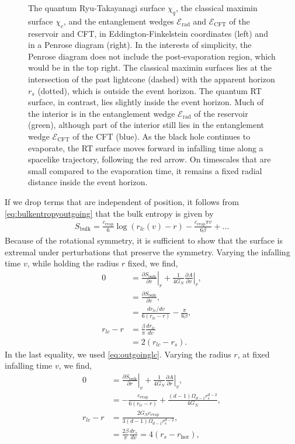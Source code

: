 \documentclass[12pt]{article}
\begin{document}
\begin{figure}[t]
\caption{The quantum Ryu-Takayanagi surface $\chi_q$, the classical maximin surface $\chi_c$, and the entanglement wedges $\mathcal{E}_\text{rad}$ and $\mathcal{E}_\text{CFT}$ of the reservoir and CFT, in Eddington-Finkelstein coordinates (left) and in a Penrose diagram (right). In the interests of simplicity, the Penrose diagram does not include the post-evaporation region, which would be in the top right. The classical maximin surfaces lies at the intersection of the past lightcone (dashed) with the apparent horizon $r_s$ (dotted), which is outside the event horizon. The quantum RT surface, in contrast, lies slightly inside the event horizon. Much of the interior is in the entanglement wedge $\mathcal{E}_\text{rad}$ of the reservoir (green), although part of the interior still lies in the entanglement wedge $\mathcal{E}_\text{CFT}$ of the CFT (blue). As the black hole continues to evaporate, the RT surface moves forward in infalling time along a spacelike trajectory, following the red arrow. On timescales that are small compared to the evaporation time, it remains a fixed radial distance inside the event horizon.}
\label{fig:bh_eddington}
\end{figure}
If we drop terms that are independent of position, it follows from \eqref{eq:bulkentropyoutgoing} that the bulk entropy is given by
\begin{align} \label{eq:outgoingentropy}
S_\text{bulk} =  \frac{c_\text{evap}}{6}\log\left(r_{lc}(v) - r\right) - \frac{c_\text{evap} \pi v}{6 \beta} + \dots
\end{align}
Because of the rotational symmetry, it is sufficient to show that the surface is extremal under perturbations that preserve the symmetry. Varying the infalling time $v$, while holding the radius $r$ fixed, we find,
\begin{align}
0 &= \left. \frac{\partial S_\text{bulk}}{\partial v} \right|_r + \frac{1}{4G_N} \left. \frac{\partial A}{\partial v}\right|_r,
\\& = \frac{\partial S_\text{bulk}}{\partial v},
\\& = \frac{d r_{lc}/d v}{6(r_{lc} - r)} - \frac{\pi}{6 \beta},
\\r_{lc} - r & = \frac{\beta}{\pi}\frac{d r_{lc}}{d v}
\\& = 2(r_{lc} - r_s).  \label{eq:dSdv}
\end{align}
In the last equality, we used \eqref{eq:outgoinglc}. Varying the radius $r$, at fixed infalling time $v$, we find,
\begin{align}
0 &= \left. \frac{\partial S_\text{bulk} }{\partial r}\right|_v + \frac{1}{4G_N} \left.\frac{\partial A}{\partial r}\right|_v,
\\&= -\frac{c_\text{evap}}{6(r_{lc} - r)} + \frac{(d-1)\Omega_{d-1} r_s^{d-2}}{4G_N},
\\r_{lc} - r &=\frac{2G_N c_\text{evap}}{3(d-1) \Omega_{d-1} r_s^{d-2}}, \label{eq:dSdr}
\\&= \frac{2\beta}{\pi} \frac{d r_s}{d v} = 4(r_s - r_\text{hor}), \label{eq:rlcr=4rsrhor}
\end{align}
\end{document}
